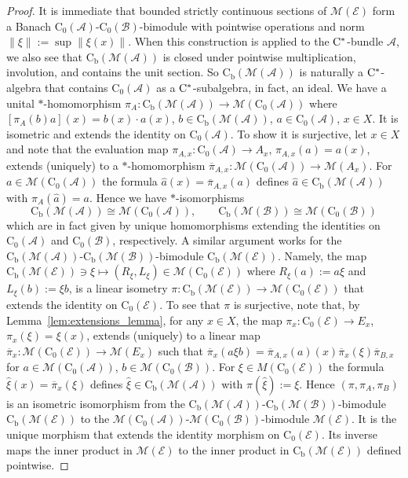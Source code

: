 \documentclass[11 pt, leqno]{amsart}
\numberwithin{equation}{section}
\theoremstyle{plain}
\theoremstyle{definition}
\newcommand*{\contz}{\mathrm{C_0}}%
\newcommand*{\contb}{\mathrm{C_b}}%
\newcommand{\B}{\mathcal B}
\newcommand{\M}{\mathcal M}
\newcommand{\EE}{\mathcal E}
\newcommand{\p}{\varphi}
\newcommand{\A}{\mathcal A}
\newcommand{\cst}{\ifmmode\mathrm{C}^*\else{$\mathrm{C}^*$}\fi}
\begin{document}
\begin{proof}
It is immediate that bounded strictly continuous sections of $\M(\EE)$ form a Banach $\contz(\A)$-$\contz(\B)$-bimodule with pointwise operations and norm  $\|\xi\|:=\sup\|\xi(x)\|$. 
When this construction is applied to the $\cst$-bundle $\A$, we also see that $\contb(\M(\A))$ is closed under pointwise multiplication, involution, and contains the unit section. So $\contb(\M(\A))$ is naturally a $\cst$-algebra that contains $\contz(\A)$ as a $\cst$-subalgebra, in fact, an ideal. We have a unital $*$-homomorphism $\pi_A:\contb(\M(\A))\to \M(\contz(\A))$ where $[\pi_A(b)a](x)=b(x)\cdot a(x)$, $b\in \contb(\M(\A))$, $a\in \contz(\A)$, $x\in X$.
It is isometric and extends the identity on $\contz(\A)$. 
To show it is surjective, let $x\in X$ and note that the evaluation  map $\pi_{A,x}:\contz(\A)\to A_x$, $\pi_{A,x}(a)=a(x)$, extends (uniquely) to a $*$-homomorphism $\overline{\pi}_{A,x}:\M(\contz(\A))\to \M(A_x)$. For $a\in \M(\contz(\A))$ the formula $\widehat{a}(x)=\overline{\pi}_{A,x}(a)$ defines $\widehat{a}\in \contb(\M(\A))$ with $\pi_A(\widehat{a})=a$. 
Hence we have $*$-isomorphisms 
\[
    \contb(\M(\A))\cong \M(\contz(\A)),\qquad \contb(\M(\B))\cong \M(\contz(\B))
\] 
which are in fact given by unique homomorphisms extending the identities on $\contz(\A)$ and $\contz(\B)$, respectively.
A similar argument works for the $\contb(\M(\A))$-$\contb(\M(\B))$-bimodule $\contb(\M(\EE))$. 
Namely, the map  $\contb(\M(\EE))\ni \xi\mapsto (R_\xi, L_{\xi}) \in \M(\contz(\EE))$ where $R_{\xi}(a):=a \xi$ and $L_\xi(b):=\xi b$, is a  linear isometry  $\pi:\contb(\M(\EE))\to \M(\contz(\EE))$ that extends the identity on $\contz(\EE)$. 
To see that $\pi$ is surjective, note that, by Lemma~\ref{lem:extensions_lemma}, for any $x\in X$, the  map $\pi_x:\contz(\EE)\to E_x$, $\pi_x(\xi)=\xi(x)$, extends (uniquely) to a linear map $\overline{\pi}_x:\M(\contz(\EE))\to \M(E_x)$ such that $\overline{\pi}_x(a\xi b)=\overline{\pi}_{A,x}(a)(x)\overline{\pi}_x(\xi)\overline{\pi}_{B,x}$ for $a\in \M(\contz(\A))$, $b\in \M(\contz(\B))$. 
For $\xi\in M(\contz(\EE))$ the formula $\widehat{\xi}(x)=\overline{\pi}_{x}(\xi)$ defines $\widehat{\xi}\in \contb(\M(\A))$ with $\pi(\widehat{\xi}):=\xi$.
Hence $(\pi,\pi_A,\pi_B)$ is an isometric isomorphism from  the $\contb(\M(\A))$-$\contb(\M(\B))$-bimodule $\contb(\M(\EE))$ to the $\M(\contz(\A))$-$\M(\contz(\B))$-bimodule $\M(\EE)$. 
It is the unique morphism that extends the identity morphism on $\contz(\EE)$.
Its inverse maps the inner product in $\M(\EE)$ to the inner product in $\contb(\M(\EE))$ defined pointwise. 
\end{proof}
\end{document}
